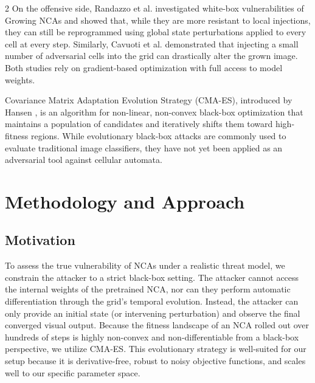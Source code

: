 \documentclass{article}
\begin{document}
\begin{multicols}{2}
On the offensive side, Randazzo et al. \cite{randazzo2021adversarial} investigated white-box vulnerabilities of Growing NCAs and showed that, while they are more resistant to local injections, they can still be reprogrammed using global state perturbations applied to every cell at every step. Similarly, Cavuoti et al. \cite{cavuoti2022adversarial} demonstrated that injecting a small number of adversarial cells into the grid can drastically alter the grown image. Both studies rely on gradient-based optimization with full access to model weights.

Covariance Matrix Adaptation Evolution Strategy (CMA-ES), introduced by Hansen \cite{hansen2001cmaes}, is an algorithm for non-linear, non-convex black-box optimization that maintains a population of candidates and iteratively shifts them toward high-fitness regions. While evolutionary black-box attacks are commonly used to evaluate traditional image classifiers, they have not yet been applied as an adversarial tool against cellular automata.






\section*{Methodology and Approach}

\subsection*{Motivation}

To assess the true vulnerability of NCAs under a realistic threat model, we constrain the attacker to a strict black-box setting. The attacker cannot access the internal weights of the pretrained NCA, nor can they perform automatic differentiation through the grid's temporal evolution. Instead, the attacker can only provide an initial state (or intervening perturbation) and observe the final converged visual output. Because the fitness landscape of an NCA rolled out over hundreds of steps is highly non-convex and non-differentiable from a black-box perspective, we utilize CMA-ES. This evolutionary strategy is well-suited for our setup because it is derivative-free, robust to noisy objective functions, and scales well to our specific parameter space.


\end{multicols}
\end{document}

